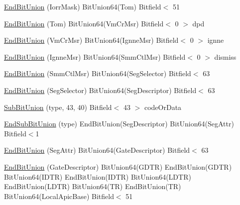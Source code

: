 \begin{DoxyCompactItemize}
\item 
\hyperlink{namespaceX86ISA_a76b9aff17d0c1da7cb62dea21f6644b4}{EndBitUnion} (IorrMask) BitUnion64(Tom) Bitfield$<$ 51
\item 
\hyperlink{namespaceX86ISA_a3cc40e149a9a3dc880196157af218ed9}{EndBitUnion} (Tom) BitUnion64(VmCrMsr) Bitfield$<$ 0 $>$ dpd
\item 
\hyperlink{namespaceX86ISA_a945ea244714dcda0e95132651a6b6a2b}{EndBitUnion} (VmCrMsr) BitUnion64(IgnneMsr) Bitfield$<$ 0 $>$ ignne
\item 
\hyperlink{namespaceX86ISA_a05c2d5933fc3e914d510e22f350a1299}{EndBitUnion} (IgnneMsr) BitUnion64(SmmCtlMsr) Bitfield$<$ 0 $>$ dismiss
\item 
\hyperlink{namespaceX86ISA_a0e146559f65e9c20474dc622495ce138}{EndBitUnion} (SmmCtlMsr) BitUnion64(SegSelector) Bitfield$<$ 63
\item 
\hyperlink{namespaceX86ISA_a557b027e8beb1e3ff0df9a1e6d7bdbc3}{EndBitUnion} (SegSelector) BitUnion64(SegDescriptor) Bitfield$<$ 63
\item 
\hyperlink{namespaceX86ISA_a6eaf5d1fcd0ae9c78d54d6ecdf97b4b5}{SubBitUnion} (type, 43, 40) Bitfield$<$ 43 $>$ codeOrData
\item 
\hyperlink{namespaceX86ISA_a976b8cb8bfaed626dd601febbf0c6fe8}{EndSubBitUnion} (type) EndBitUnion(SegDescriptor) BitUnion64(SegAttr) Bitfield$<$1
\item 
\hyperlink{namespaceX86ISA_a0c774257513afdcf9b7a3da6b27b4dfd}{EndBitUnion} (SegAttr) BitUnion64(GateDescriptor) Bitfield$<$ 63
\item 
\hyperlink{namespaceX86ISA_aab653d3e00074b5297080e982bfbdbde}{EndBitUnion} (GateDescriptor) BitUnion64(GDTR) EndBitUnion(GDTR) BitUnion64(IDTR) EndBitUnion(IDTR) BitUnion64(LDTR) EndBitUnion(LDTR) BitUnion64(TR) EndBitUnion(TR) BitUnion64(LocalApicBase) Bitfield$<$ 51
\end{DoxyCompactItemize}
